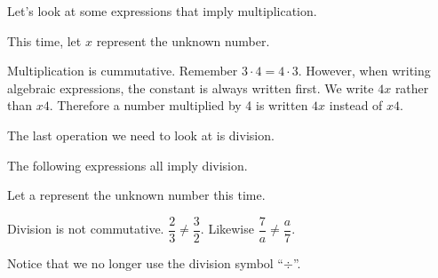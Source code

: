 Let's look at some expressions that imply multiplication.

This time, let $x$ represent the unknown number.

\begin{center}
\end{center}
\begin{fact}
Multiplication is cummutative. Remember $3\cdot 4=4\cdot3$. However, when writing algebraic expressions, the constant is always written first. We write $4x$ rather than $x4$. Therefore a number multiplied by 4 is written $4x$ instead of $x4$.
\end{fact}
The last operation we need to look at is division.

The following expressions all imply division.

Let a represent the unknown number this time.
\begin{center}
\end{center}
\begin{thinkback}
Division is not commutative. $\dfrac{2}{3}\neq\dfrac{3}{2}$. Likewise $\dfrac{7}{a}\neq\dfrac{a}{7}$.
\end{thinkback}
Notice that we no longer use the division symbol “$\div$”.

